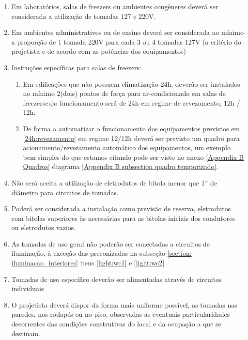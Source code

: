 \begin{enumerate}
	\item Em laboratórios, salas de freezers ou ambientes congêneres deverá ser considerada a utilização de tomadas 127 e 220V.
	
	\item Em ambientes administrativos ou de ensino deverá ser considerada no mínimo a proporção de 1 tomada 220V para cada 3 ou 4 tomadas 127V (a critério do projetista e de acordo com as potências dos equipamentos)

	\item Instruções específicas para salas de freezers:
		\begin{enumerate}
			\item \label{24h:revezamento}Em edificações que não possuem climatização 24h, deverão ser instalados no mínimo 2(dois) pontos de força para ar-condicionado em salas de freezerscujo funcionamento será de 24h em regime de revezamento, 12h / 12h.
			
			\item De forma a automatizar o funcionamento dos equipamentos previstos em \ref{24h:revezamento} em regime 12/12h deverá ser previsto um quadro para acionamento/revezamento automático dos equipamentos, um exemplo bem simples do que estamos citando pode ser visto no anexo \ref{Appendix B Quadros} diagrama \ref{Appendix B subsection quadro temporizado}.
		\end{enumerate}
	
	\item Não será aceita a utilização de eletrodutos de bitola menor que 1” de diâmetro para circuitos de tomadas.
	
	\item Poderá ser considerada a instalação como previsão de reserva, eletrodutos com bitolas superiores às necessárias para as bitolas iniciais dos condutores ou eletrodutos vazios.
	
	\item As tomadas de uso geral não poderão ser conectadas a circuitos de iluminação, à exceção das preconizadas na subseção \ref{section: iluminacao_interiores} itens \ref*{light:wc1} e \ref*{light:wc2}
	 
	\item Tomadas de uso específico deverão ser alimentadas através de circuitos individuais
	
	\item O projetista deverá dispor da forma mais uniforme possível, as tomadas nas paredes, nos rodapés ou no piso, observadas as eventuais particularidades decorrentes das condições construtivas do local e da ocupação a que se destinam.


\end{enumerate}
